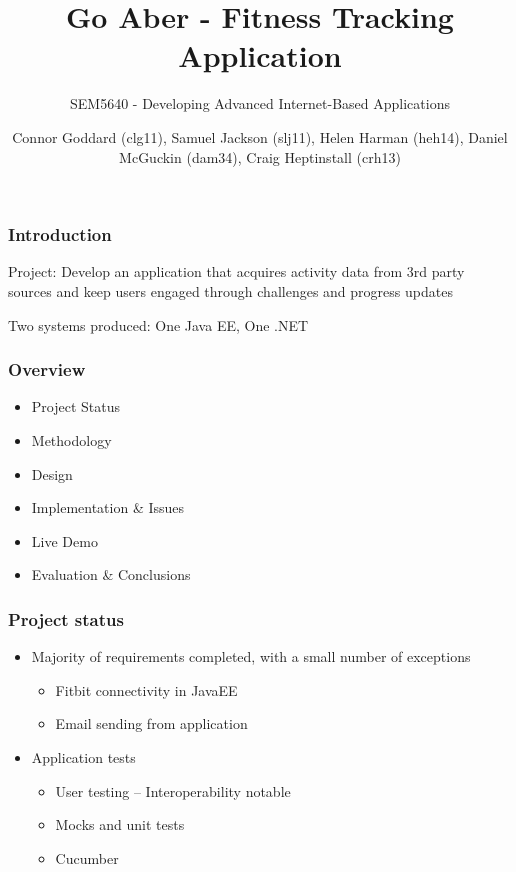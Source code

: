 \documentclass[10pt, compress]{beamer}
\title{Go Aber - Fitness Tracking Application}
\subtitle{\small{SEM5640 - Developing Advanced Internet-Based Applications}}
\author{\footnotesize{Connor Goddard (clg11), Samuel Jackson (slj11), Helen Harman (heh14), Daniel McGuckin (dam34), Craig Heptinstall (crh13)}}
\institute{Aberystwyth University}
\begin{document}
\maketitle

\begin{frame}[fragile]
  \frametitle{Introduction}
  
  \small {
  
    Project: Develop an application that acquires activity data from 3rd party sources and keep users engaged through challenges and progress updates
    
    \vspace{10pt}
    
    Two systems produced: One Java EE, One .NET
    
    }

\end{frame}

\begin{frame}[fragile]
  \frametitle{Overview}
  
  \small{
  
  	\begin{itemize}
    	\item Project Status
    	\item Methodology
    	\item Design
    	\item Implementation \& Issues
    	\item Live Demo
    	\item Evaluation \& Conclusions
    \end{itemize}
    
    }

\end{frame}


\begin{frame}[fragile]
\frametitle{Project status}

\begin{itemize}
	\item Majority of requirements completed, with a small number of exceptions
		\begin{itemize}
			\item Fitbit connectivity in JavaEE
			\item Email sending from application
		\end{itemize}
	\item Application tests
		\begin{itemize}
			\item User testing – Interoperability notable
			\item Mocks and unit tests
			\item Cucumber
		\end{itemize}
\end{itemize}
\end{frame}
\end{document}
